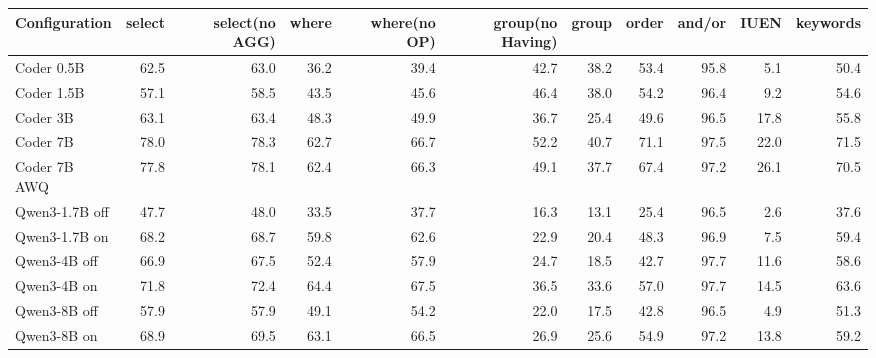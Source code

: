 \begin{tabular}{@{}l rrrrrrrrrr@{}}
\toprule
Configuration & select & select(no AGG) & where & where(no OP) & group(no Having) & group & order & and/or & IUEN & keywords \\
\midrule
Coder 0.5B & 62.5 & 63.0 & 36.2 & 39.4 & 42.7 & 38.2 & 53.4 & 95.8 & 5.1 & 50.4 \\
Coder 1.5B & 57.1 & 58.5 & 43.5 & 45.6 & 46.4 & 38.0 & 54.2 & 96.4 & 9.2 & 54.6 \\
Coder 3B & 63.1 & 63.4 & 48.3 & 49.9 & 36.7 & 25.4 & 49.6 & 96.5 & 17.8 & 55.8 \\
Coder 7B & 78.0 & 78.3 & 62.7 & 66.7 & 52.2 & 40.7 & 71.1 & 97.5 & 22.0 & 71.5 \\
Coder 7B AWQ & 77.8 & 78.1 & 62.4 & 66.3 & 49.1 & 37.7 & 67.4 & 97.2 & 26.1 & 70.5 \\
\midrule
Qwen3-1.7B off & 47.7 & 48.0 & 33.5 & 37.7 & 16.3 & 13.1 & 25.4 & 96.5 & 2.6 & 37.6 \\
Qwen3-1.7B on & 68.2 & 68.7 & 59.8 & 62.6 & 22.9 & 20.4 & 48.3 & 96.9 & 7.5 & 59.4 \\
Qwen3-4B off & 66.9 & 67.5 & 52.4 & 57.9 & 24.7 & 18.5 & 42.7 & 97.7 & 11.6 & 58.6 \\
Qwen3-4B on & 71.8 & 72.4 & 64.4 & 67.5 & 36.5 & 33.6 & 57.0 & 97.7 & 14.5 & 63.6 \\
Qwen3-8B off & 57.9 & 57.9 & 49.1 & 54.2 & 22.0 & 17.5 & 42.8 & 96.5 & 4.9 & 51.3 \\
Qwen3-8B on & 68.9 & 69.5 & 63.1 & 66.5 & 26.9 & 25.6 & 54.9 & 97.2 & 13.8 & 59.2 \\
\bottomrule
\end{tabular}

